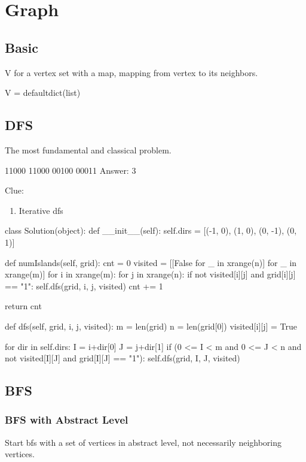 \chapter{Graph}

\section{Basic}
 V for a vertex set with a map, mapping from vertex to its neighbors.
\begin{python}
V = defaultdict(list)
\end{python}
\section{DFS}
 The most fundamental and classical problem. 
\begin{python}
11000
11000
00100
00011
Answer: 3
\end{python}
Clue:
\begin{enumerate}
\item Iterative dfs
\end{enumerate}
\begin{python}
class Solution(object):
  def __init__(self):
    self.dirs = [(-1, 0), (1, 0), (0, -1), (0, 1)]

  def numIslands(self, grid):
    cnt = 0
    visited = [[False for _ in xrange(n)] 
               for _ in xrange(m)]
    for i in xrange(m):
      for j in xrange(n):
        if not visited[i][j] and grid[i][j] == "1":
          self.dfs(grid, i, j, visited)
          cnt += 1

    return cnt

  def dfs(self, grid, i, j, visited):
    m = len(grid)
    n = len(grid[0])
    visited[i][j] = True

    for dir in self.dirs:
      I = i+dir[0]
      J = j+dir[1]
      if (0 <= I < m and 0 <= J < n and 
        not visited[I][J] and grid[I][J] == "1"):
        self.dfs(grid, I, J, visited)
\end{python}
\section{BFS}
\subsection{BFS with Abstract Level}
Start bfs with a set of vertices in abstract level, not necessarily neighboring vertices.

